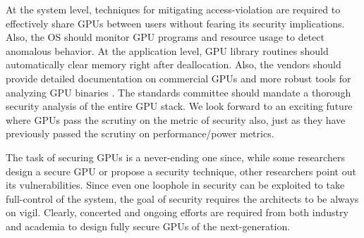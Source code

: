 At the system level, techniques for mitigating access-violation are required to effectively share GPUs between users without fearing its security implications. Also, the OS should monitor GPU programs and resource usage to detect anomalous behavior. At the application level, GPU library routines should automatically clear memory right after deallocation. Also, the vendors should provide detailed documentation on commercial GPUs and more robust tools for analyzing GPU binaries \cite{albassam2016enforcing}. The standards committee should mandate a thorough security analysis of the entire GPU stack.  We look forward to an exciting future where GPUs pass the scrutiny on the metric of security also, just as they have previously passed the scrutiny on performance/power metrics.

The task of securing GPUs is a never-ending one since, while some researchers design a secure GPU or propose a security technique, other researchers point out its vulnerabilities. Since even one loophole in security can be exploited to take full-control of the system, the goal of security requires the architects to be always on vigil. Clearly, concerted and ongoing efforts are required from both industry and academia to design fully secure GPUs of the next-generation.  
 
    

  


   

 
